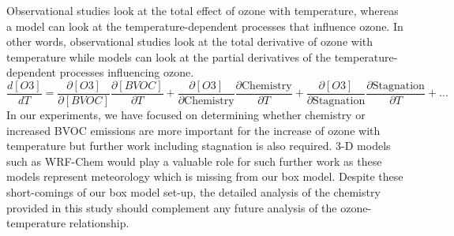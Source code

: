Observational studies look at the total effect of ozone with temperature, whereas a model can look at the temperature-dependent processes that influence ozone. 
In other words, observational studies look at the total derivative of ozone with temperature while models can look at the partial derivatives of the temperature-dependent processes influencing ozone. 
\begin{equation*} 
    \frac{d[O3]}{dT} = \frac{\partial [O3]}{\partial [BVOC]}\frac{\partial [BVOC]}{\partial T} + \frac{\partial [O3]}{\partial \text{Chemistry}}\frac{\partial \text{Chemistry}}{\partial T} + \frac{\partial [O3]}{\partial \text{Stagnation}}\frac{\partial \text{Stagnation}}{\partial T} + \dots
\end{equation*}
In our experiments, we have focused on determining whether chemistry or increased BVOC emissions are more important for the increase of ozone with temperature but further work including stagnation is also required. 
3-D models such as WRF-Chem would play a valuable role for such further work as these models represent meteorology which is missing from our box model.
Despite these short-comings of our box model set-up, the detailed analysis of the chemistry provided in this study should complement any future analysis of the ozone-temperature relationship.
